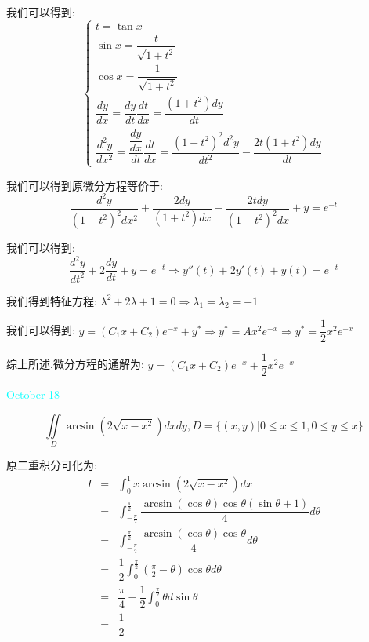 \begin{solution}

	我们可以得到:  $$\left\lbrace
	\begin{array}{l}
		t=\tan x\\
		\sin x=\dfrac{t}{\sqrt{1+t^2}}\\
		\cos x=\dfrac{1}{\sqrt{1+t^2}}\\
		\dfrac{dy}{dx}=\dfrac{dy}{dt}\dfrac{dt}{dx}=\dfrac{(1+t^2)dy}{dt}\\
		\dfrac{d^2y}{dx^2}=\dfrac{\dfrac{dy}{dx}}{dt}\dfrac{dt}{dx}=\dfrac{(1+t^2)^2d^2y}{dt^2}-\dfrac{2t(1+t^2)dy}{dt}
	\end{array}
	\right. $$
	
	我们可以得到原微分方程等价于:  
	$$\dfrac{d^2y}{(1+t^2)^2dx^2}+\dfrac{2dy}{(1+t^2)dx}-\dfrac{2tdy}{(1+t^2)^2dx}+y=e^{-t}$$
	
	我们可以得到:  
	$$\dfrac{d^2y}{dt^2}+2\dfrac{dy}{dt}+y=e^{-t}\Rightarrow y''(t)+2y'(t)+y(t)=e^{-t}$$
	
	我们得到特征方程:  $\lambda^2+2\lambda+1=0\Rightarrow \lambda_{1}=\lambda_{2}=-1$
	
	我们可以得到:  $y=(C_{1}x+C_{2})e^{-x}+y^{*}\Rightarrow y^{*}=Ax^2e^{-x}\Rightarrow y^{*}=\dfrac{1}{2}x^2e^{-x}$
	
	综上所述,微分方程的通解为:  $y=(C_{1}x+C_{2})e^{-x}+\dfrac{1}{2}x^2e^{-x}$
\end{solution}


\textcolor{cyan}{October 18}

\begin{example}[][Exam: 36.3.7]
	$$\iint\limits_{D}\arcsin(2\sqrt{x-x^2})dxdy, D=\{(x,y)|0\leq x\leq 1,0\leq y\leq x\}$$
\end{example}


\begin{solution}

	原二重积分可化为:  
	\begin{eqnarray*}
		I&=&\int_{0}^{1}x\arcsin(2\sqrt{x-x^2})dx\\
		&=&\int_{-\frac{\pi}{2}}^{\frac{\pi}{2}}\dfrac{\arcsin(\cos\theta) \cos\theta(\sin\theta+1)}{4}d\theta\\
		&=&\int_{-\frac{\pi}{2}}^{\frac{\pi}{2}}\dfrac{\arcsin(\cos\theta)\cos\theta}{4}d\theta\\
		&=&\dfrac{1}{2}\int_{0}^{\frac{\pi}{2}}(\frac{\pi}{2}-\theta)\cos\theta d\theta\\
		&=&\dfrac{\pi}{4}-\dfrac{1}{2}\int_{0}^{\frac{\pi}{2}}\theta d\sin\theta\\
		&=&\dfrac{1}{2}
	\end{eqnarray*}
\end{solution}

